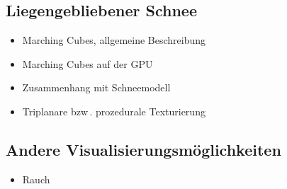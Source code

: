 \subsection{Liegengebliebener Schnee}

\begin{itemize}
\item Marching Cubes, allgemeine Beschreibung
\item Marching Cubes auf der GPU
\item Zusammenhang mit Schneemodell
\item Triplanare bzw\,. prozedurale Texturierung
\end{itemize}

\subsection{Andere Visualisierungsmöglichkeiten}

\begin{itemize}
\item Rauch
\end{itemize}